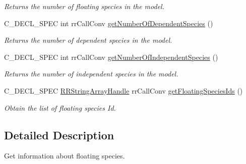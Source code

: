 \begin{DoxyCompactItemize}
\begin{DoxyCompactList}\small\item\em \-Returns the number of floating species in the model. \end{DoxyCompactList}\item 
\hypertarget{group__floating_ga7d573d16a02b3bf4361c00065f624e0b}{
\-C\-\_\-\-D\-E\-C\-L\-\_\-\-S\-P\-E\-C int rr\-Call\-Conv \hyperlink{group__floating_ga7d573d16a02b3bf4361c00065f624e0b}{get\-Number\-Of\-Dependent\-Species} ()}
\label{group__floating_ga7d573d16a02b3bf4361c00065f624e0b}

\begin{DoxyCompactList}\small\item\em \-Returns the number of dependent species in the model. \end{DoxyCompactList}\item 
\hypertarget{group__floating_ga29811c87b0f144e506c93373418fbe8b}{
\-C\-\_\-\-D\-E\-C\-L\-\_\-\-S\-P\-E\-C int rr\-Call\-Conv \hyperlink{group__floating_ga29811c87b0f144e506c93373418fbe8b}{get\-Number\-Of\-Independent\-Species} ()}
\label{group__floating_ga29811c87b0f144e506c93373418fbe8b}

\begin{DoxyCompactList}\small\item\em \-Returns the number of independent species in the model. \end{DoxyCompactList}\item 
\-C\-\_\-\-D\-E\-C\-L\-\_\-\-S\-P\-E\-C \*
\hyperlink{rr__c__types_8h_a90941a6a2247bf7a8ec3d429729c5f9a}{\-R\-R\-String\-Array\-Handle} rr\-Call\-Conv \hyperlink{group__floating_gad138c0072b188551324147fb17635b48}{get\-Floating\-Species\-Ids} ()
\begin{DoxyCompactList}\small\item\em \-Obtain the list of floating species \-Id. \end{DoxyCompactList}\end{DoxyCompactItemize}


\subsection{\-Detailed \-Description}
\-Get information about floating species. 

